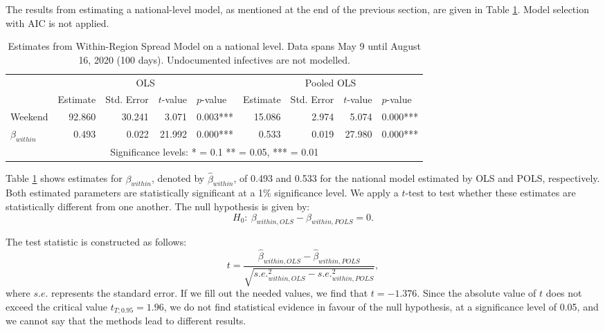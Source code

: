 \documentclass[12pt]{article}
\begin{document}
	The results from estimating a national-level model, as mentioned at the end of the previous section, are given in Table \ref{tab:results_within_national}. Model selection with AIC is not applied.
	
	\begin{table}[H]
	    \centering
	    \caption{Estimates from Within-Region Spread Model on a national level. Data spans May 9 until August 16, 2020 (100 days). Undocumented infectives are not modelled.}
		\label{tab:results_within_national}
	    \begin{tabular}{lrrrlrrrl}
	        \toprule
    		& \multicolumn{4}{c}{OLS} & \multicolumn{4}{c}{Pooled OLS} \\
    		                \cmidrule(lr){2-5}
                            \cmidrule(lr){6-9}
    		& Estimate & Std. Error & $t$-value & $p$-value & Estimate & Std. Error & $t$-value & $p$-value \\* \midrule
    		Weekend             & 92.860 & 30.241 & 3.071 & 0.003*** & 15.086 & 2.974 & 5.074 & 0.000*** \\*
    		$\beta_{within}$    & 0.493 & 0.022 & 21.992 & 0.000*** & 0.533 & 0.019 & 27.980 & 0.000*** \\* \bottomrule
    		\multicolumn{9}{c}{Significance levels: * = 0.1 ** = 0.05, *** = 0.01}
	    \end{tabular}
	\end{table}
	
	Table \ref{tab:results_within_national} shows estimates for $\beta_{within}$, denoted by $\hat{\beta}_{within}$, of 0.493 and 0.533 for the national model estimated by OLS and POLS, respectively. Both estimated parameters are statistically significant at a 1\% significance level. We apply a $t$-test to test whether these estimates are statistically different from one another. The null hypothesis is given by:
	    \[H_0:~ \beta_{within,OLS} - \beta_{within,POLS} = 0.\]
	
	The test statistic is constructed as follows:
	    \[t = \frac{\hat{\beta}_{within, OLS} - \hat{\beta}_{within, POLS}}{\sqrt{s.e.^2_{within, OLS} - s.e.^2_{within, POLS}}},\]
	where $s.e.$ represents the standard error. If we fill out the needed values, we find that $t = -1.376$. Since the absolute value of $t$ does not exceed the critical value $t_{T; 0.95} = 1.96$, we do not find statistical evidence in favour of the null hypothesis, at a significance level of 0.05, and we cannot say that the methods lead to different results. \\
	
\end{document}
